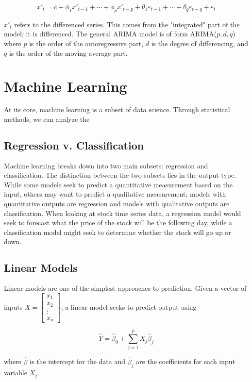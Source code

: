 \documentclass[12pt]{article}
\begin{document}
$$ x'_{t} = c + \phi_{1}x'_{t-1} + \cdots + \phi_{p}x'_{t-p} + \theta_{1}\varepsilon_{t-1} + \cdots + \theta_{q}\varepsilon_{t-q} + \varepsilon_{t} $$

$x'_t$ refers to the differenced series. This comes from the "integrated" part of the model; it is differenced. The general ARIMA model is of form ARIMA($p,d,q$) where $p$ is the order of the autoregressive part, $d$ is the degree of differencing, and $q$ is the order of the moving average part. \cite[8.5]{forecasting}



\section{Machine Learning} 
At its core, machine learning is a subset of data science. Through statistical methods, we can analyze the 

\subsection{Regression v. Classification}
Machine learning breaks down into two main subsets: regression and classification. The distinction between the two subsets lies in the output type. While some models seek to predict a quantitative measurement based on the input, others may want to predict a qualitative measurement; models with quantitative outputs are regression and models with qualitative outputs are classification. \cite[9-10]{springer} When looking at stock time series data, a regression model would seek to forecast what the price of the stock will be the following day, while a classification model might seek to determine whether the stock will go up or down. 

\subsection{Linear Models}
Linear models are one of the simplest approaches to prediction. Given a vector of inputs 
$X =  \begin{bmatrix} 
x_1 \\
x_2 \\
\vdots \\
x_n
\end{bmatrix}
$, a linear model seeks to predict output using 

$$\hat{Y} = \hat{\beta}_0 + \sum_{j=1}^{p} X_j \hat{\beta}_j$$

where $\hat{\beta}$ is the intercept for the data and $\hat{\beta}_j$ are the coefficients for each input variable $X_j$. \cite[11]{springer}
\end{document}
